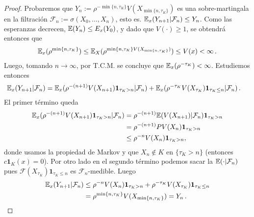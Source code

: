 \begin{proof}
\gris
Probaremos que $Y_n:=\rho^{-\min\{n,\tau_K\}}V(X_{\min\{n,\tau_K\}})$ es una sobre-martingala en la filtración $\mathcal{F}_n:=\sigma(X_0,\dots,X_n)$, esto es. $\mathbb{E}_x(Y_{n+1}|\mathcal{F}_n)\leq Y_n$. Como las esperanzas decrecen, $\mathbb{E}(Y_n)\leq E_x(Y_0)$, y dado que  $V(\cdot)\geq 1$, se obtendr\'a entonces que
$$ \mathbb{E}_x(\rho^{\min\{n,\tau_K\}})\leq\mathbb{E}_X(\rho^{\min\{n,\tau_K\}V(X_{\min\{n,\tau_K\}})})\leq V(x)<\infty \, . $$
Luego, tomando $n\to\infty$, por T.C.M. se concluye que  $\mathbb{E}_x(\rho^{-\tau_K})<\infty$. Estudiemos entonces  
\begin{alignat*}{2}
\mathbb{E}_x(Y_{n+1}|\mathcal{F}_n) & = \mathbb{E}_x(\rho^{-(n+1)}V(X_{n+1})\mathbf{1}_{\tau_K>n}|\mathcal{F}_n)+\mathbb{E}_x(\rho^{-\tau_K}V(X_{\tau_K})\mathbf{1}_{\tau_K\leq n}|\mathcal{F}_n) \, .
\end{alignat*}
El primer término queda
\begin{alignat*}{2}
\mathbb{E}_x(\rho^{-(n+1)}V(X_{n+1})\mathbf{1}_{\tau_K>n}|\mathcal{F}_n) & = \rho^{-(n+1)}\mathbb{E}(V(X_{n+1})|\mathcal{F}_n)\mathbf{1}_{\tau_K>n} \\
& = \rho^{-(n+1)}PV(X_n)\mathbf{1}_{\tau_K>n} \\
& \leq \rho^{-n}V(X_n)\mathbf{1}_{\tau_K>n}, 
\end{alignat*}
donde usamos la propiedad de Markov y que $X_n\notin K$ en $\{\tau_K>n\}$ (entonces  $c\mathbf{1}_{K}(x)=0$). Por otro lado en el segundo término podemos sacar la $\mathbb{E}(\cdot|\mathcal{F}_n)$ pues $\mathcal{F}(X_{\tau_K})\mathbf{1}_{\tau_K\leq n}$ es $\mathcal{F}_n$-medible. Luego
\begin{alignat*}{2}
\mathbb{E}_x(Y_{n+1}|\mathcal{F}_n) & \leq \rho^{-n}V(X_n)\mathbf{1}_{\tau_K>n}+\rho^{-\tau_K}V(X_{\tau_K})\mathbf{1}_{\tau_K\leq n} \\
& = \rho^{\min\{n,\tau_K\}}V(X_{\min\{n,\tau_K\}})=Y_n \, .
\end{alignat*}
\findem
\negro
\end{proof}
